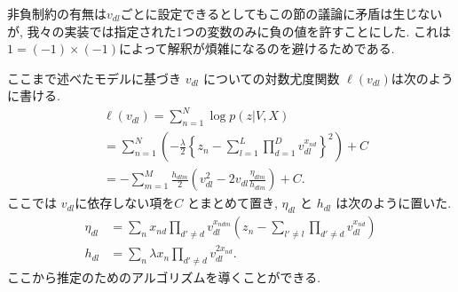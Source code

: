 \documentclass[a4paper,12ptc]{jsarticle} %
\newcommand{\C}{C}
\begin{document}
非負制約の有無は$v_{dl}$ごとに設定できるとしてもこの節の議論に矛盾は生じないが, 我々の実装では指定された1つの変数のみに負の値を許すことにした. これは$1=(-1)\times(-1)$によって解釈が煩雑になるのを避けるためである.

ここまで述べたモデルに基づき $v_{dl}$ についての対数尤度関数 $\ell(v_{dl})$は次のように書ける.
\begin{align*}
& \ell(v_{dl}) =\sum_{n=1}^{N} \log p(z|V, X)\\
&= \sum_{n=1}^{N}\left(-\frac{\lambda}{2}\left\{ z_n -\sum_{l=1}^L\prod_{d=1}^D v_{dl}^{x_{nd}} \right\}^2\right)+ \C\\
&= -\sum_{m=1}^M\frac{h_{dlm}}{2}\left(v_{dl}^2-2v_{dl}\frac{\eta_{dlm}}{h_{dlm}}\right) +C.
\end{align*}
ここでは $v_{dl}$に依存しない項を$C$ とまとめて置き, $\eta_{dl}$ と $h_{dl}$ は次のように置いた.
\begin{align}
\eta_{dl} &= \sum_n x_{nd} \prod_{d' \neq d} v_{dl}^{x_{ndm}}\left( z_{n} - \sum_{l'\neq l} \prod_{d' \neq d} v_{dl}^{x_{nd}} \right) \label{eq_eta}\\
h_{dl} &= \sum_n \lambda x_{n} \prod_{d' \neq d} v_{dl}^{2x_{nd}}. \label{eq_h}
\end{align}
ここから推定のためのアルゴリズムを導くことができる.
\end{document}

